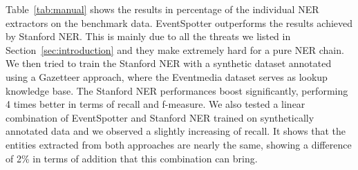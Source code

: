 \documentclass[10pt,a4paper]{article}
\begin{document}

Table~\ref{tab:manual} shows the results in percentage of the individual NER extractors on the benchmark data. EventSpotter outperforms the results achieved by Stanford NER. This is mainly due to all the threats we listed in Section~\ref{sec:introduction} and they make extremely hard for a pure NER chain. We then tried to train the Stanford NER with a synthetic dataset annotated using a Gazetteer approach, where the Eventmedia dataset serves as lookup knowledge base. The Stanford NER performances boost significantly, performing 4 times better in terms of recall and f-measure. We also tested a linear combination of EventSpotter and Stanford NER trained on synthetically annotated data and we observed a slightly increasing of recall. It shows that the entities extracted from both approaches are nearly the same, showing a difference of 2\% in terms of addition that this combination can bring.
\end{document}
